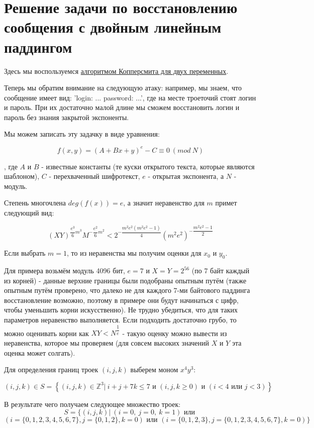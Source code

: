 \documentclass[12pt,a4paper]{scrartcl}
\begin{document}
\section{Решение задачи по восстановлению сообщения с двойным линейным паддингом}

Здесь мы воспользуемся \href{https://yatb.kksctf.ru/}{алгоритмом Копперсмита для двух переменных}.

Теперь мы обратим внимание на следующую атаку: например, мы знаем, что сообщение имеет вид: 'login: ... password: ...', где на месте троеточий стоят логин и пароль. При их достаточно малой длине мы сможем восстановить логин и пароль без знания закрытой экспоненты.

Мы можем записать эту задачку в виде уравнения:

$$f(x,y)=(A+Bx+y)^e - C \equiv 0\ (mod\ N)$$

, где $A$ и $B$ - известные константы (те куски открытого текста, которые являются шаблоном), $C$ - перехваченный шифротекст, $e$ - открытая экспонента, а $N$  - модуль.

Степень многочлена $deg(f(x))=e$, а значит неравенство для $m$ примет следующий вид:

$$(XY)^{\dfrac{e^3}{6}m^3}M^{-\dfrac{e^2}{6}m^2} < 2^{-\dfrac{m^2e^2(m^2e^2-1)}{4}}(m^2e^2)^{-\dfrac{m^2e^2-1}{2}}$$

Если выбрать $m=1$, то из неравенства мы получим оценки для $x_0$ и $y_0$.  

Для примера возьмём модуль 4096 бит, $e=7$ и $X=Y=2^{56}$ (по 7 байт каждый из корней) - данные верхние границы были подобраны опытным путём (также опытным путём проверено, что далеко не для каждого 7-ми байтового паддинга восстановление возможно, поэтому в примере они будут начинаться с цифр, чтобы уменьшить корни искусственно). Не трудно убедиться, что для таких параметров неравенство выполняется. Если подходить достаточно грубо, то можно оценивать корни как $XY < N^{\dfrac{1}{e}}$ - такую оценку можно вывести из неравенства, которое мы проверяем (для совсем высоких значений $X$ и $Y$ эта оценка может солгать).

Для определения границ троек $(i,j,k)$ выберем моном $x^4y^3$:


$$(i,j,k) \in S = \left\{ (i,j,k) \in \mathbb{Z}^3 |\ i+j+7k \leq 7\text{ и }(i,j,k \geq 0)\text{ и }(i<4\text{ или }j<3)\right\}$$


В результате чего получаем следующее множество троек:
$$S = \{ (i,j,k) |\ (i=0,\ j=0,\ k=1)\text{ или }$$
$$(i=\{0,1,2,3,4,5,6,7\},j=\{0,1,2\}, k=0)\text{ или } (i=\{0,1,2,3\},j=\{0,1,2,3,4,5,6,7\}, k=0)\}$$
\end{document}
